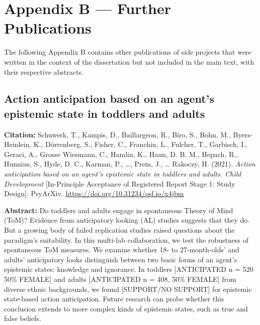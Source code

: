 \documentclass[
]{scrbook}
\begin{document}


\chapter*{Appendix B --- Further Publications}\label{appendixB}

The following Appendix B contains other publications of side projects that were written in the context of the dissertation but not included in the main text, with their respective abstracts.

\section*{Action anticipation based on an agent's epistemic state in toddlers and adults}\label{manybabies}

\textbf{Citation:} Schuwerk, T., Kampis, D., Baillargeon, R., Biro, S., Bohn, M., Byers-Heinlein, K., Dörrenberg, S., Fisher, C., Franchin, L., Fulcher, T., Garbisch, I., Geraci, A., Grosse Wiesmann, C., Hamlin, K., Haun, D. B. M., Hepach, R., Hunnius, S., Hyde, D. C., Karman, P., \ldots, Prein, J., \ldots{} Rakoczy, H. (2021). \emph{Action anticipation based on an agent's epistemic state in toddlers and adults. Child Development} {[}In-Principle Acceptance of Registered Report Stage 1: Study Design{]}. PsyArXiv. \mbox{\url{https://doi.org/10.31234/osf.io/x4jbm}}

\textbf{Abstract:} Do toddlers and adults engage in spontaneous Theory of Mind (ToM)? Evidence from anticipatory looking (AL) studies suggests that they do. But a growing body of failed replication studies raised questions about the paradigm's suitability. In this multi-lab collaboration, we test the robustness of spontaneous ToM measures. We examine whether 18- to 27-month-olds' and adults' anticipatory looks distinguish between two basic forms of an agent's epistemic states: knowledge and ignorance. In toddlers {[}ANTICIPATED n = 520 50\% FEMALE{]} and adults {[}ANTICIPATED n = 408, 50\% FEMALE{]} from diverse ethnic backgrounds, we found {[}SUPPORT/NO SUPPORT{]} for epistemic state-based action anticipation. Future research can probe whether this conclusion extends to more complex kinds of epistemic states, such as true and false beliefs.
\end{document}
